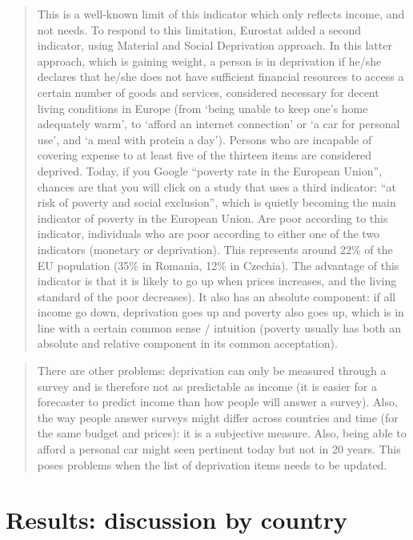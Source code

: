 \documentclass[
  9pt,
  a4paper,
  DIV=11,
  numbers=noendperiod]{scrartcl}
\begin{document}
\begin{quote}
This is a well-known limit of this indicator which only reflects income,
and not needs. To respond to this limitation, Eurostat added a second
indicator, using Material and Social Deprivation approach. In this
latter approach, which is gaining weight, a person is in deprivation if
he/she declares that he/she does not have sufficient financial resources
to access a certain number of goods and services, considered necessary
for decent living conditions in Europe (from `being unable to keep one's
home adequately warm', to `afford an internet connection' or `a car for
personal use', and `a meal with protein a day'). Persons who are
incapable of covering expense to at least five of the thirteen items are
considered deprived. Today, if you Google ``poverty rate in the European
Union'', chances are that you will click on a study that uses a third
indicator: ``at risk of poverty and social exclusion'', which is quietly
becoming the main indicator of poverty in the European Union. Are poor
according to this indicator, individuals who are poor according to
either one of the two indicators (monetary or deprivation). This
represents around 22\% of the EU population (35\% in Romania, 12\% in
Czechia). The advantage of this indicator is that it is likely to go up
when prices increases, and the living standard of the poor decreases).
It also has an absolute component: if all income go down, deprivation
goes up and poverty also goes up, which is in line with a certain common
sense / intuition (poverty usually has both an absolute and relative
component in its common acceptation).
\end{quote}

\begin{quote}
There are other problems: deprivation can only be measured through a
survey and is therefore not as predictable as income (it is easier for a
forecaster to predict income than how people will answer a survey).
Also, the way people answer surveys might differ across countries and
time (for the same budget and prices): it is a subjective measure. Also,
being able to afford a personal car might seen pertinent today but not
in 20 years. This poses problems when the list of deprivation items
needs to be updated.
\end{quote}

\hypertarget{results-discussion-by-country}{%
\section{Results: discussion by
country}\label{results-discussion-by-country}}
\end{document}

